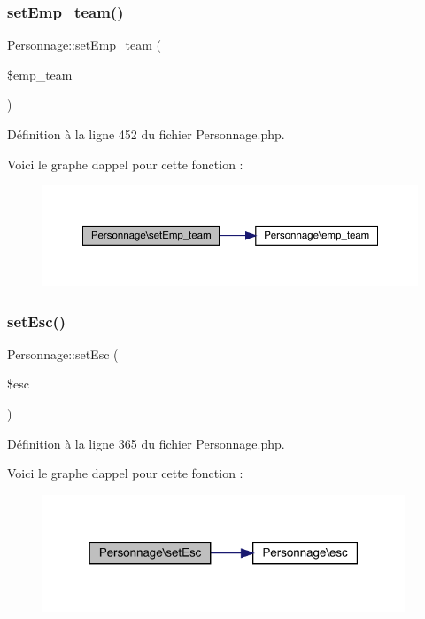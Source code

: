 \subsubsection{\texorpdfstring{set\+Emp\+\_\+team()}{setEmp\_team()}}
{\footnotesize\ttfamily Personnage\+::set\+Emp\+\_\+team (\begin{DoxyParamCaption}\item[{}]{\$emp\+\_\+team }\end{DoxyParamCaption})}



Définition à la ligne 452 du fichier Personnage.\+php.

Voici le graphe d\textquotesingle{}appel pour cette fonction \+:\nopagebreak
\begin{figure}[H]
\begin{center}
\leavevmode
\includegraphics[width=350pt]{class_personnage_aec0f318abc45dee8a4b011722efd74ed_cgraph}
\end{center}
\end{figure}
\mbox{\label{class_personnage_aefa2ea9bcc007c36688272ef5881e30a}} 
\subsubsection{\texorpdfstring{set\+Esc()}{setEsc()}}
{\footnotesize\ttfamily Personnage\+::set\+Esc (\begin{DoxyParamCaption}\item[{}]{\$esc }\end{DoxyParamCaption})}



Définition à la ligne 365 du fichier Personnage.\+php.

Voici le graphe d\textquotesingle{}appel pour cette fonction \+:\nopagebreak
\begin{figure}[H]
\begin{center}
\leavevmode
\includegraphics[width=307pt]{class_personnage_aefa2ea9bcc007c36688272ef5881e30a_cgraph}
\end{center}
\end{figure}
\mbox{\label{class_personnage_af368ea425266209c0dcf800bdfcf1b84}} 
